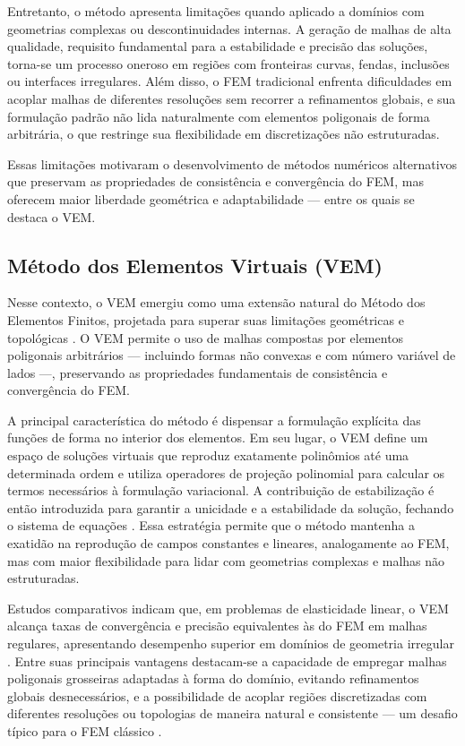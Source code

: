\documentclass[12pt,openright,oneside,a4paper,english,brazil]{abntex2}
\begin{document}
Entretanto, o método apresenta limitações quando aplicado a domínios com geometrias complexas ou descontinuidades internas. A geração de malhas de alta qualidade, requisito fundamental para a estabilidade e precisão das soluções, torna-se um processo oneroso em regiões com fronteiras curvas, fendas, inclusões ou interfaces irregulares. Além disso, o FEM tradicional enfrenta dificuldades em 
acoplar malhas de diferentes resoluções sem recorrer a refinamentos globais, e sua formulação padrão não lida naturalmente com elementos poligonais de forma arbitrária, o que restringe sua flexibilidade em discretizações não estruturadas.

Essas limitações motivaram o desenvolvimento de métodos numéricos alternativos que preservam as propriedades de consistência e convergência do FEM, mas oferecem maior liberdade geométrica e adaptabilidade — entre os quais se destaca o VEM.

\subsection{Método dos Elementos Virtuais (VEM)}

Nesse contexto, o VEM emergiu como uma extensão natural do Método dos Elementos Finitos, projetada para superar suas limitações geométricas e topológicas \cite{beirao2013}. O VEM permite o uso de malhas compostas por elementos poligonais arbitrários — incluindo formas não convexas e com número variável de lados —, preservando as propriedades fundamentais de 
consistência e convergência do FEM.

A principal característica do método é dispensar a formulação explícita das funções de forma no interior dos elementos. Em seu lugar, o VEM define um espaço de soluções virtuais que reproduz exatamente polinômios até uma determinada ordem e utiliza operadores de projeção polinomial para calcular os termos necessários à formulação variacional. A contribuição de estabilização é então introduzida 
para garantir a unicidade e a estabilidade da solução, fechando o sistema de equações \cite{beirao2013}. Essa estratégia permite que o método mantenha a exatidão na reprodução de campos constantes e lineares, analogamente ao FEM, mas com maior flexibilidade para lidar com geometrias complexas e malhas não estruturadas.

Estudos comparativos indicam que, em problemas de elasticidade linear, o VEM alcança taxas de convergência e precisão equivalentes às do FEM em malhas regulares, apresentando desempenho superior em domínios de geometria irregular \cite{mengolini2019}. Entre suas principais vantagens destacam-se a capacidade de empregar malhas poligonais grosseiras adaptadas à forma do domínio, evitando 
refinamentos globais desnecessários, e a possibilidade de acoplar regiões discretizadas com diferentes resoluções ou topologias de maneira natural e consistente — um desafio típico para o FEM clássico \cite{mengolini2019}.
\end{document}
